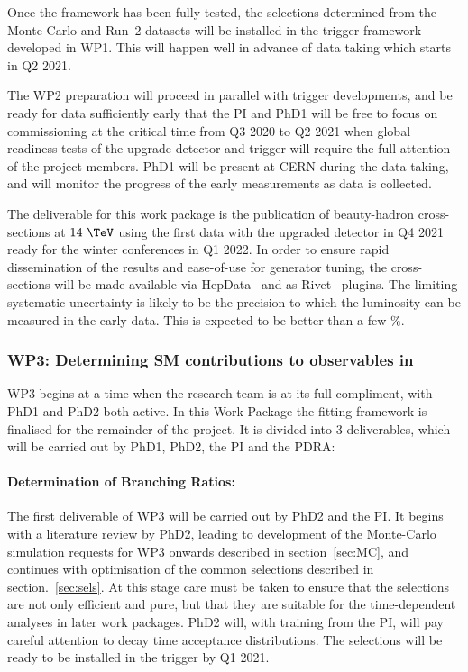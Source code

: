 \documentclass[11pt,a4paper]{article}
\begin{document}
Once the framework has been fully tested, the selections determined from the Monte Carlo and Run~2 datasets will be installed in the trigger framework developed in WP1. This will happen well in advance of data taking which starts in Q2 2021.

The WP2 preparation will proceed in parallel with trigger developments, and be ready for data sufficiently early that the PI and PhD1 will be free to focus on commissioning at the critical time from Q3 2020 to Q2 2021 when global readiness tests of the upgrade detector and trigger will require the full attention of the project members. PhD1 will be present at CERN during the data taking, and will monitor the progress of the early measurements as data is collected. 

The deliverable for this work package is the publication of beauty-hadron cross-sections at $14~\TeV$ using the first data with the upgraded \LHCb detector in Q4 2021 ready for the winter conferences in Q1 2022. 
In order to ensure rapid dissemination of the results and ease-of-use for generator tuning, the cross-sections will be made available via HepData~\cite{Maguire:2017ypu} and as Rivet~\cite{Buckley:2010ar} plugins. The limiting systematic uncertainty is likely to be the precision to which the luminosity can be measured in the early data. This is expected to be better than a few $\%$. 

\subsubsection{WP3: Determining SM contributions to \CP observables in \HepProcess{\PB\to\PD\PD}}
WP3 begins at a time when the research team is at its full compliment, with PhD1 and PhD2 both active. In this Work Package the fitting framework is finalised for the remainder of the project. It is divided into 3 deliverables, which will be carried out by PhD1, PhD2, the PI and the PDRA:

\paragraph{Determination of Branching Ratios:}
\label{sec:BRs}
The first deliverable of WP3 will be carried out by PhD2 and the PI. It begins with a literature review by PhD2, leading to development of the Monte-Carlo simulation requests for WP3 onwards described in section~\ref{sec:MC}, and continues with optimisation of the common selections described in section.~\ref{sec:sels}. At this stage care must be taken to ensure that the selections are not only efficient and pure, but that they are suitable for the time-dependent analyses in later work packages. PhD2 will, with training from the PI, will pay careful attention to decay time acceptance distributions. The selections will be ready to be installed in the trigger by Q1 2021. 
\end{document}
